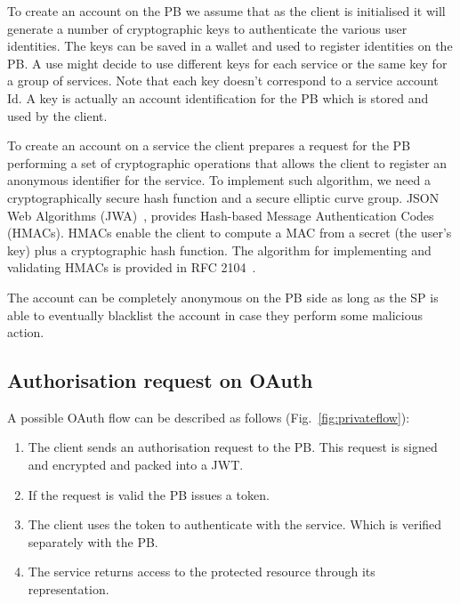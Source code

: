To create an account on the PB we assume that as the client is initialised it will generate a number of cryptographic keys to authenticate the various user identities. The keys can be saved in a wallet and used to register identities on the PB. A use might decide to use different keys for each service or the same key for a group of services. Note that each key doesn't correspond to a service account Id. A key is actually an account identification for the PB which is stored and used by the client.

To create an account on a service the client prepares a request for the PB performing a set of cryptographic operations that allows the client to register an anonymous identifier for the service. To implement such algorithm, we need a
cryptographically secure hash function and a secure elliptic curve group. JSON Web Algorithms (JWA)~\cite{jones2015jwa}, provides Hash-based Message Authentication Codes (HMACs). HMACs enable the client to compute a MAC from a secret (the user's key) plus a cryptographic hash function. The algorithm for implementing and validating HMACs is provided in RFC 2104~\cite{krawczyk1997rfc}.

The account can be completely anonymous on the PB side as long as the SP is able to eventually blacklist the account in case they perform some malicious action.

\subsection{Authorisation request on OAuth}

A possible OAuth flow can be described as follows (Fig.~\ref{fig:privateflow}):
\begin{enumerate}
    \item The client sends an authorisation request to the PB. This request is signed and encrypted and packed into a JWT.
    \item If the request is valid the PB issues a token.
    \item The client uses the token to authenticate with the service. Which is verified separately with the PB.
    \item The service returns access to the protected resource through its representation.
\end{enumerate}

